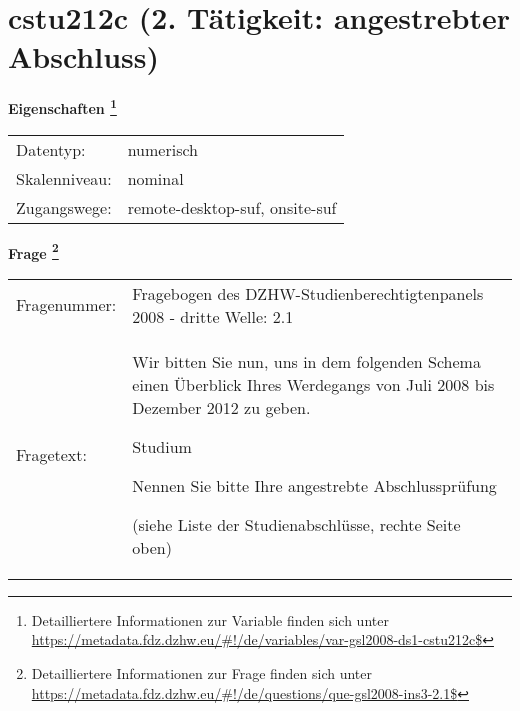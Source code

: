 
    \setcounter{footnote}{0}

    \vspace*{-1.8cm}
	\section{cstu212c (2. Tätigkeit: angestrebter Abschluss)}
	\label{section:cstu212c}



    \vspace*{0.5cm}
    \noindent\textbf{Eigenschaften
	\footnote{Detailliertere Informationen zur Variable finden sich unter
		\url{https://metadata.fdz.dzhw.eu/\#!/de/variables/var-gsl2008-ds1-cstu212c$}}}\\
	\begin{tabularx}{\hsize}{@{}lX}
	Datentyp: & numerisch \\
	Skalenniveau: & nominal \\
	Zugangswege: &
	  remote-desktop-suf, 
	  onsite-suf
 \\
    \end{tabularx}



				\vspace*{0.5cm}
                \noindent\textbf{Frage
	                \footnote{Detailliertere Informationen zur Frage finden sich unter
		              \url{https://metadata.fdz.dzhw.eu/\#!/de/questions/que-gsl2008-ins3-2.1$}}}\\
				\begin{tabularx}{\hsize}{@{}lX}
					Fragenummer: &
					  Fragebogen des DZHW-Studienberechtigtenpanels 2008 - dritte Welle:
					  2.1
 \\
					Fragetext: & Wir bitten Sie nun, uns in dem folgenden Schema einen Überblick Ihres Werdegangs von Juli 2008 bis Dezember 2012 zu geben.\par  Studium\par  Nennen Sie bitte Ihre angestrebte Abschlussprüfung \par  (siehe Liste der Studienabschlüsse, rechte Seite oben) \\
				\end{tabularx}





